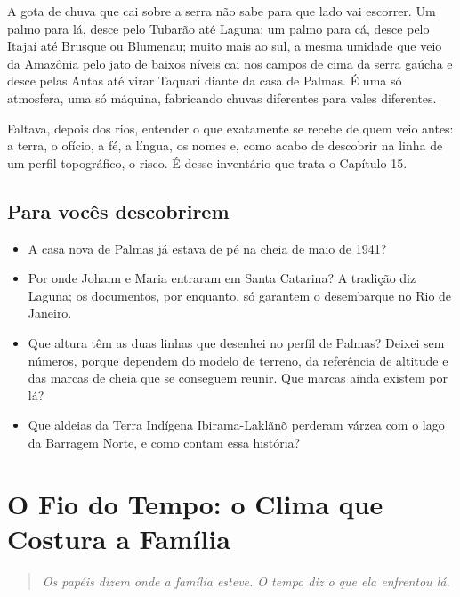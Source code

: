 \documentclass[
  brazilian,
  11pt,
  openany]{book}
\providecommand{\tightlist}{%
  \setlength{\itemsep}{0pt}\setlength{\parskip}{0pt}}
\begin{document}
A gota de chuva que cai sobre a serra não sabe para que lado vai
escorrer. Um palmo para lá, desce pelo Tubarão até Laguna; um palmo para
cá, desce pelo Itajaí até Brusque ou Blumenau; muito mais ao sul, a
mesma umidade que veio da Amazônia pelo jato de baixos níveis cai nos
campos de cima da serra gaúcha e desce pelas Antas até virar Taquari
diante da casa de Palmas. É uma só atmosfera, uma só máquina, fabricando
chuvas diferentes para vales diferentes.

Faltava, depois dos rios, entender o que exatamente se recebe de quem
veio antes: a terra, o ofício, a fé, a língua, os nomes e, como acabo de
descobrir na linha de um perfil topográfico, o risco. É desse inventário
que trata o Capítulo 15.

\section{Para vocês descobrirem}\label{para-vocuxeas-descobrirem-12}

\begin{itemize}
\tightlist
\item
  A casa nova de Palmas já estava de pé na cheia de maio de 1941?
\item
  Por onde Johann e Maria entraram em Santa Catarina? A tradição diz
  Laguna; os documentos, por enquanto, só garantem o desembarque no Rio
  de Janeiro.
\item
  Que altura têm as duas linhas que desenhei no perfil de Palmas? Deixei
  sem números, porque dependem do modelo de terreno, da referência de
  altitude e das marcas de cheia que se conseguem reunir. Que marcas
  ainda existem por lá?
\item
  Que aldeias da Terra Indígena Ibirama-Laklãnõ perderam várzea com o
  lago da Barragem Norte, e como contam essa história?
\end{itemize}

\chapter{O Fio do Tempo: o Clima que Costura a Família}\label{cap-14}

\begin{quote}
\emph{Os papéis dizem onde a família esteve. O tempo diz o que ela
enfrentou lá.}
\end{quote}
\end{document}

